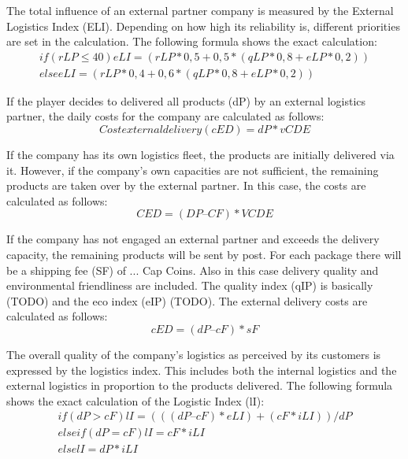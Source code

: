 The total influence of an external partner company is measured by the External Logistics Index (ELI). Depending on how high its reliability is, different priorities are set in the calculation. The following formula shows the exact calculation: 
\begin{equation}
\begin{aligned}
    if (rLP ≤ 40) eLI = { (rLP*0,5 + 0,5*(qLP*0,8 + eLP*0,2)) } \\
    else eLI = { (rLP*0,4 + 0,6*(qLP*0,8 + eLP*0,2)) }
\end{aligned}
\end{equation}

If the player decides to delivered all products (dP) by an external logistics partner, the daily costs for the company are calculated as follows:
\begin{equation}
    Cost external delivery (cED) = dP * vCDE
\end{equation}

If the company has its own logistics fleet, the products are initially delivered via it. However, if the company's own capacities are not sufficient, the remaining products are taken over by the external partner. In this case, the costs are calculated as follows: 
\begin{equation}
    CED = ( DP – CF ) * VCDE
\end{equation}

If the company has not engaged an external partner and exceeds the delivery capacity, the remaining products will be sent by post. For each package there will be a shipping fee (SF) of ... Cap Coins. Also in this case delivery quality and environmental friendliness are included. The quality index (qIP) is basically (TODO) and the eco index (eIP) (TODO). The external delivery costs are calculated as follows:  
\begin{equation}
    cED = ( dP – cF ) * sF
\end{equation}

The overall quality of the company's logistics as perceived by its customers is expressed by the logistics index. This includes both the internal logistics and the external logistics in proportion to the products delivered. The following formula shows the exact calculation of the Logistic Index (lI):
\begin{equation}
\begin{aligned}
    if ( dP > cF ) lI = { ((( dP – cF) * eLI ) + ( cF * iLI )) / dP} \\
    elseif ( dP = cF ) lI = { cF * iLI } \\
    else lI = { dP * iLI }  
\end{aligned}
\end{equation}